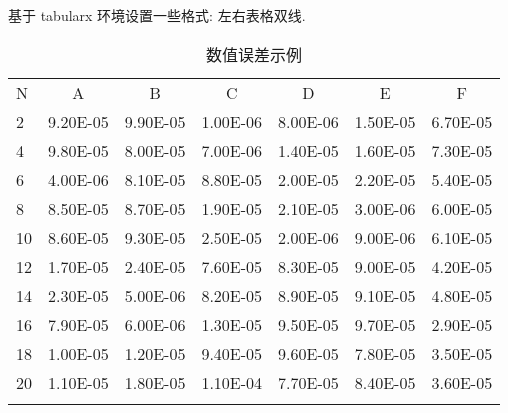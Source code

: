 \documentclass[openany,twoside,12pt]{book}
\theoremstyle{plain}
\begin{document}
基于 tabularx 环境设置一些格式: 左右表格双线.
\begin{table}[htp!]
\centering
\caption{数值误差示例}
\label{tab:error2}
\begin{tabularx}{0.96\textwidth}{||P{0.8cm}|C|C|C|C|C|C||}
\Xhline{2\arrayrulewidth}
N  & A       & B    & C       & D      & E       & F   \\
\Xhline{2\arrayrulewidth}
2  & 9.20E-05 & 9.90E-05 & 1.00E-06 & 8.00E-06 & 1.50E-05 & 6.70E-05 \\
4  & 9.80E-05 & 8.00E-05 & 7.00E-06 & 1.40E-05 & 1.60E-05 & 7.30E-05 \\
6  & 4.00E-06 & 8.10E-05 & 8.80E-05 & 2.00E-05 & 2.20E-05 & 5.40E-05 \\
8  & 8.50E-05 & 8.70E-05 & 1.90E-05 & 2.10E-05 & 3.00E-06 & 6.00E-05 \\
10 & 8.60E-05 & 9.30E-05 & 2.50E-05 & 2.00E-06 & 9.00E-06 & 6.10E-05 \\
12 & 1.70E-05 & 2.40E-05 & 7.60E-05 & 8.30E-05 & 9.00E-05 & 4.20E-05 \\
14 & 2.30E-05 & 5.00E-06 & 8.20E-05 & 8.90E-05 & 9.10E-05 & 4.80E-05 \\
16 & 7.90E-05 & 6.00E-06 & 1.30E-05 & 9.50E-05 & 9.70E-05 & 2.90E-05 \\
18 & 1.00E-05 & 1.20E-05 & 9.40E-05 & 9.60E-05 & 7.80E-05 & 3.50E-05 \\
20 & 1.10E-05 & 1.80E-05 & 1.10E-04   & 7.70E-05 & 8.40E-05 & 3.60E-05  \\
\Xhline{2\arrayrulewidth}
\end{tabularx}
\end{table}






\renewcommand{\bibname}{参考文献}

\clearpage
{}
{} %






\end{document}
